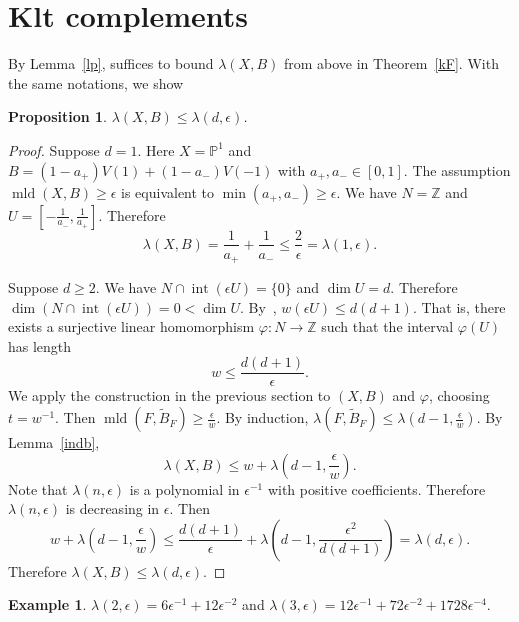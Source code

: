 \documentclass[12pt,twoside]{amsart}
\newcommand{\Z}{{\mathbb Z}}
\newcommand{\bP}{{\mathbb P}} %
\newcommand{\Int}{\operatorname{int}}
\newcommand{\mld}{\operatorname{mld}}
\theoremstyle{plain}
\newtheorem{prop}[thm]{Proposition}
\theoremstyle{definition}
\newtheorem{exmp}[thm]{Example}
\theoremstyle{remark}
\begin{document}

\section{Klt complements}


By Lemma~\ref{lp}, suffices to bound $\lambda(X,B)$ from above in Theorem~\ref{kF}.
With the same notations, we show

\begin{prop}\label{mi}
	$\lambda(X,B)\le  \lambda(d,\epsilon)$.
\end{prop}

\begin{proof} Suppose $d=1$.
	Here $X=\bP^1$ and $B=(1-a_+)V(1)+(1-a_-)V(-1)$ with $a_+,a_-\in [0,1]$.
	The assumption $\mld(X,B)\ge \epsilon$ is equivalent to $\min(a_+,a_-)\ge \epsilon$.	
	We have $N=\Z$ and $U=[-\frac{1}{a_-},\frac{1}{a_+}]$. Therefore 
	$$
	\lambda(X,B)=\frac{1}{a_+}+\frac{1}{a_-} \le \frac{2}{\epsilon}=\lambda(1,\epsilon).
	$$
	
	Suppose $d\ge 2$. We have $N\cap \Int(\epsilon U)=\{0\}$ and $\dim U=d$.
	Therefore $\dim (N\cap \Int(\epsilon U))=0<\dim U$. By~\cite[Theorem 5.2.b)]{AI20},
	$w(\epsilon U)\le d(d+1)$. That is, there exists a surjective linear homomorphism
	$\varphi\colon N\to \Z$ such that the interval $\varphi(U)$ has length 
	$$
	w\le \frac{d(d+1)}{\epsilon}.
	$$
	We apply the construction in the previous section to $(X,B)$ and $\varphi$,
	choosing $t=w^{-1}$. Then $\mld(F,\tilde{B}_F)\ge \frac{\epsilon}{w}$.
	By induction, $\lambda(F,\tilde{B}_F)\le \lambda(d-1, \frac{\epsilon}{w})$.
	By Lemma~\ref{indb}, 
	$$
	\lambda(X,B) \le w+\lambda(d-1,\frac{\epsilon}{w}).
	$$
	Note that $\lambda(n,\epsilon)$ is a polynomial in $\epsilon^{-1}$ with positive coefficients.
	Therefore $\lambda(n,\epsilon)$ is decreasing in $\epsilon$. Then
	$$
	w+\lambda(d-1,\frac{\epsilon}{w})\le \frac{d(d+1)}{\epsilon}+\lambda(d-1,\frac{\epsilon^2}{d(d+1)})=
	\lambda(d,\epsilon).
     $$
     Therefore $\lambda(X,B)\le \lambda(d,\epsilon)$.
\end{proof}

\begin{exmp}
	 $\lambda(2,\epsilon)=6\epsilon^{-1}+12\epsilon^{-2}$ and 
	$\lambda(3,\epsilon)=12\epsilon^{-1}+72\epsilon^{-2}+1728 \epsilon^{-4}$.
\end{exmp}
\end{document}
